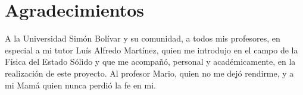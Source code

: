 \chapter*{Agradecimientos}

A la Universidad Simón Bolívar y su comunidad, a todos mis profesores, en especial a mi tutor Luís Alfredo Martínez, quien me introdujo en el campo de la Física del Estado Sólido y que me acompañó, personal y académicamente, en la realización de este proyecto. Al profesor Mario, quien no me dejó rendirme, y a mi Mamá quien nunca perdió la fe en mi. 

